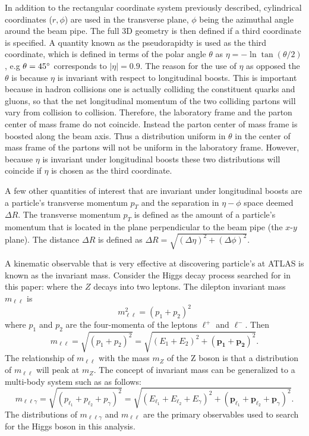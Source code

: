 In addition to the rectangular coordinate system previously described,
cylindrical coordinates ($r, \phi$) are
used in the transverse plane, $\phi$ being the azimuthal angle around the
beam pipe. The full 3D geometry is then defined if a third coordinate is specified.
A quantity known as the pseudorapidty is used as the third coordinate, 
which is defined in terms of the 
polar angle $\theta$ as $\eta = -\ln \tan(\theta/2)$, e.g $\theta = 45^\circ$
corresponds to $|\eta| = 0.9$. The reason for the use of $\eta$ as opposed
the $\theta$ is because $\eta$ is invariant with respect to longitudinal boosts. This
is important because in hadron collisions one is actually colliding the
constituent quarks and gluons, so that the net longitudinal momentum of the two
colliding partons will vary from collision to collision. Therefore, the laboratory
frame and the parton center of mass frame do not coincide. Instead the parton
center of mass frame is boosted along the beam axis. Thus a distribution
uniform in $\theta$ in the center of mass frame of the partons will not
be uniform in the laboratory frame. However, because $\eta$ is invariant
under longitudinal boosts these two distributions will coincide if $\eta$
is chosen as the third coordinate.

A few other quantities of interest that are invariant under longitudinal boosts
are a particle's transverse momentum $p_T$ and the separation in $\eta-\phi$
space deemed $\Delta R$. The transverse momentum $p_T$ is defined as the 
amount of a particle's momentum that is located in the plane perpendicular 
to the beam pipe (the $x$-$y$ plane). The distance $\Delta R$ 
is defined as $\Delta R = \sqrt{(\Delta \eta)^2 + (\Delta \phi)^2}$.

A kinematic observable that is very effective at discovering particle's at
ATLAS is known as the invariant mass. Consider the Higgs decay process
searched for in this paper: \HTollg where the $Z$ decays into two leptons.
The dilepton invariant mass $m_{\ell\ell}$ is
\[
    m^2_{\ell\ell} = (p_1 + p_2)^2
\]
where $p_1$ and $p_2$ are the four-momenta of the leptons $\ell^+$ and $\ell^-$.
Then
\[
    m_{\ell\ell} = \sqrt{(p_1 + p_2)^2} = \sqrt{(E_1 + E_2)^2 + (\mathbf{p_1} + \mathbf{p_2})^2}.
\]
The relationship of $m_{\ell\ell}$ with the mass $m_Z$ of the Z boson is that a
distribution of $m_{\ell\ell}$ will peak at $m_{Z}$. The concept of invariant
mass can be generalized to a multi-body system such as \HTollg as follows:
\[
    m_{\ell\ell\gamma} = \sqrt{(p_{\ell_1} + p_{\ell_2} + p_{\gamma})^2} =
    \sqrt{(E_{\ell_1} + E_{\ell_2} + E_{\gamma})^2 + (\mathbf{p}_{\ell_1} + 
    \mathbf{p}_{\ell_2} + \mathbf{p}_{\gamma})^2}. 
\]
The distributions of $m_{\ell\ell\gamma}$ and $m_{\ell\ell}$ are the primary
observables used to search for the Higgs boson in this analysis.

